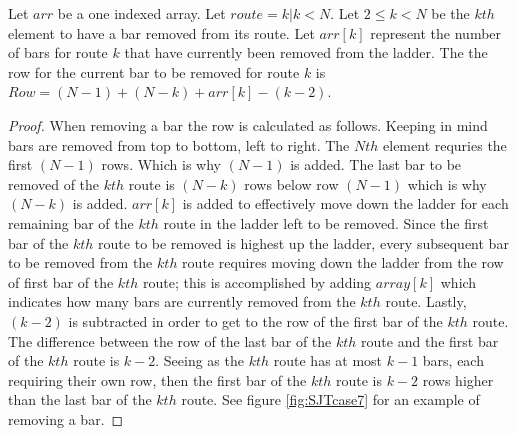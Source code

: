 

\begin{lemma}
  Let $arr$ be a one indexed array. Let $route=k | k < N$. Let $2 \leq k < N$ be the $kth$ element to have a bar removed from its route. 
  Let $arr[k]$ represent the number of bars for route $k$ that have currently been removed from the ladder. 
  The the row for the current bar to be removed for route $k$ is $Row=(N-1) + (N-k) + arr[k] - (k-2)$.
\end{lemma}
\begin{proof}
  When removing a bar the row is calculated as follows. Keeping in mind bars are removed from top to bottom, left to right.
  The $Nth$ element requries the first $(N-1)$ rows. Which is why $(N-1)$ is added. The last bar to be removed of the $kth$ route is $(N-k)$
  rows below row $(N-1)$ which is why $(N-k)$ is added. $arr[k]$ is added to effectively move down the ladder 
  for each remaining bar of the $kth$ route in the ladder left to be removed. Since the first bar of the $kth$ route 
  to be removed is highest up the ladder, every subsequent bar to be removed from the $kth$ route requires 
  moving down the ladder from the row of first bar of the $kth$ route; this is accomplished by adding $array[k]$ which 
  indicates how many bars are currently removed from the $kth$ route. Lastly, $(k-2)$  is subtracted in order to 
  get to the row of the first bar of the $kth$ route. The difference between the row of the last bar of the $kth$ route and 
  the first bar of the $kth$ route is $k-2$. Seeing as the $kth$ route has at most $k-1$ bars, each requiring their own row, then the 
  first bar of the $kth$ route is $k-2$ rows higher than the last bar of the $kth$ route. See figure \ref{fig:SJTcase7} for 
  an example of removing a bar.\pagebreak
\end{proof}

